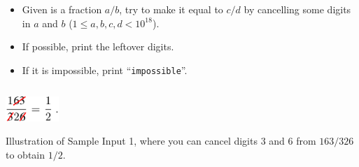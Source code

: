\begin{frame}
  \frametitle{\problemtitle}

  \begin{columns}
    \begin{column}[T]{.70\textwidth}
      \begin{itemize}
      \item Given is a fraction $a/b$,
        try to make it equal to $c/d$ by
        cancelling some digits in $a$ and $b$
        ($1\leq a,b,c,d< 10^{18}$).
      \item If possible, print the leftover digits.
      \item If it is impossible, print ``\texttt{impossible}''.
      \end{itemize}
    \end{column}

  \end{columns}

  \centering
  \vspace{3em}
  \includegraphics[trim={0 0 1ex 0},clip,width=0.15\textwidth]{fraction1-half.pdf}

  \small Illustration of Sample Input 1, where you can cancel digits $3$ and $6$ from $163/326$ to obtain $1/2$.
\end{frame}
